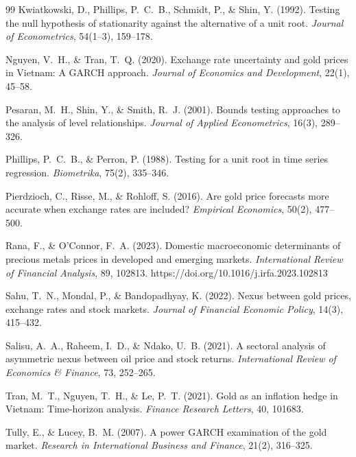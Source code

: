 \documentclass[12pt,a4paper]{article}
\begin{document}
\begin{thebibliography}{99}
Kwiatkowski, D., Phillips, P.~C.~B., Schmidt, P., \& Shin, Y. (1992).
Testing the null hypothesis of stationarity against the alternative of a unit root.
\textit{Journal of Econometrics}, 54(1--3), 159--178.

Nguyen, V.~H., \& Tran, T.~Q. (2020).
Exchange rate uncertainty and gold prices in Vietnam: A GARCH approach.
\textit{Journal of Economics and Development}, 22(1), 45--58.

Pesaran, M.~H., Shin, Y., \& Smith, R.~J. (2001).
Bounds testing approaches to the analysis of level relationships.
\textit{Journal of Applied Econometrics}, 16(3), 289--326.

Phillips, P.~C.~B., \& Perron, P. (1988).
Testing for a unit root in time series regression.
\textit{Biometrika}, 75(2), 335--346.

Pierdzioch, C., Risse, M., \& Rohloff, S. (2016).
Are gold price forecasts more accurate when exchange rates are included?
\textit{Empirical Economics}, 50(2), 477--500.

Rana, F., \& O'Connor, F.~A. (2023).
Domestic macroeconomic determinants of precious metals prices in developed
and emerging markets.
\textit{International Review of Financial Analysis}, 89, 102813.
https://doi.org/10.1016/j.irfa.2023.102813

Sahu, T.~N., Mondal, P., \& Bandopadhyay, K. (2022).
Nexus between gold prices, exchange rates and stock markets.
\textit{Journal of Financial Economic Policy}, 14(3), 415--432.

Salisu, A.~A., Raheem, I.~D., \& Ndako, U.~B. (2021).
A sectoral analysis of asymmetric nexus between oil price and stock returns.
\textit{International Review of Economics \& Finance}, 73, 252--265.

Tran, M.~T., Nguyen, T.~H., \& Le, P.~T. (2021).
Gold as an inflation hedge in Vietnam: Time-horizon analysis.
\textit{Finance Research Letters}, 40, 101683.

Tully, E., \& Lucey, B.~M. (2007).
A power GARCH examination of the gold market.
\textit{Research in International Business and Finance}, 21(2), 316--325.


\end{thebibliography}
\end{document}
